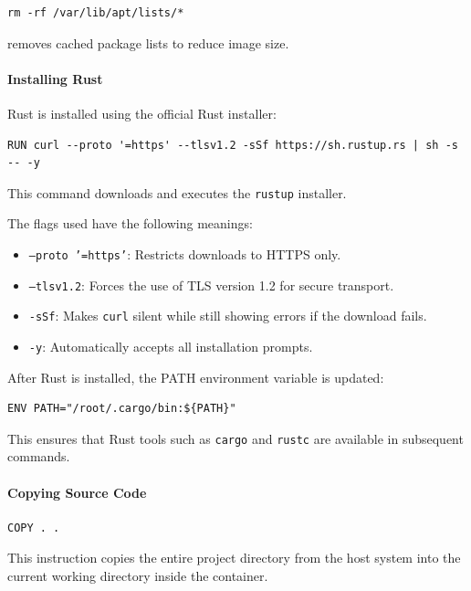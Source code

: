 \documentclass[10pt,a4paper,twocolumn]{article}
\begin{document}
\begin{verbatim}
rm -rf /var/lib/apt/lists/*
\end{verbatim}

removes cached package lists to reduce image size.

\paragraph{Installing Rust}

Rust is installed using the official Rust installer:

\begin{verbatim}
RUN curl --proto '=https' --tlsv1.2 -sSf https://sh.rustup.rs | sh -s -- -y
\end{verbatim}

This command downloads and executes the \texttt{rustup} installer.

The flags used have the following meanings:

\begin{itemize}
    \item \texttt{--proto '=https'}: Restricts downloads to HTTPS only.
    \item \texttt{--tlsv1.2}: Forces the use of TLS version 1.2 for secure transport.
    \item \texttt{-sSf}: Makes \texttt{curl} silent while still showing errors if the download fails.
    \item \texttt{-y}: Automatically accepts all installation prompts.
\end{itemize}

After Rust is installed, the PATH environment variable is updated:

\begin{verbatim}
ENV PATH="/root/.cargo/bin:${PATH}"
\end{verbatim}

This ensures that Rust tools such as \texttt{cargo} and \texttt{rustc} are available in subsequent commands.

\paragraph{Copying Source Code}

\begin{verbatim}
COPY . .
\end{verbatim}

This instruction copies the entire project directory from the host system into the current working directory inside the container.
\end{document}
